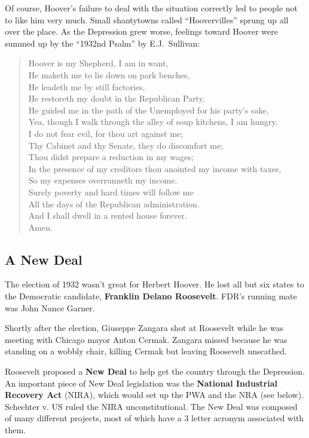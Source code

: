 Of course,
Hoover's failure to deal with the situation correctly led to people not to like him very much.
Small shantytowns called ``Hoovervilles'' sprung up all over the place.
As the Depression grew worse,
feelings toward Hoover were summed up by the ``1932nd Psalm'' by E.J.\ Sullivan:
\begin{quote}
  Hoover is my Shepherd, I am in want, \\
  He maketh me to lie down on park benches, \\
  He leadeth me by still factories, \\
  He restoreth my doubt in the Republican Party. \\
  He guided me in the path of the Unemployed for his party's sake, \\
  Yea, though I walk through the alley of soup kitchens, I am hungry. \\
  I do not fear evil, for thou art against me; \\
  Thy Cabinet and thy Senate, they do discomfort me; \\
  Thou didst prepare a reduction in my wages; \\
  In the presence of my creditors thou anointed my income with taxes, \\
  So my expenses overrunneth my income. \\
  Surely poverty and hard times will follow me \\
  All the days of the Republican administration. \\
  And I shall dwell in a rented house forever. \\
  Amen.
\end{quote}

\subsection*{A New Deal}

The election of 1932 wasn't great for Herbert Hoover.
He lost all but six states to the Democratic candidate, \textbf{Franklin Delano Roosevelt}.
FDR's running mate was John Nance Garner.

Shortly after the election,
Giuseppe Zangara shot at Roosevelt while he was meeting with Chicago mayor Anton Cermak.
Zangara missed because he was standing on a wobbly chair,
killing Cermak but leaving Roosevelt unscathed.

Roosevelt proposed a \textbf{New Deal} to help get the country through the Depression.
An important piece of New Deal legislation was the
\textbf{National Industrial Recovery Act} (NIRA),
which would set up the PWA and the NRA (see below).
Schechter v. US ruled the NIRA unconstitutional.
The New Deal was composed of many different projects,
most of which have a 3 letter acronym associated with them.

